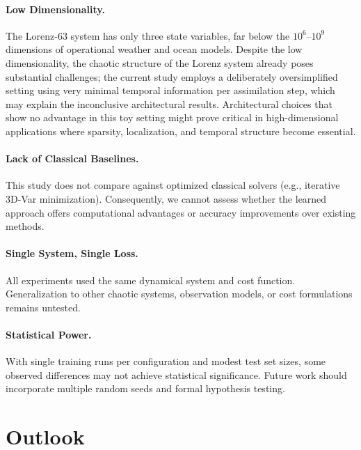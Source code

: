 \documentclass[12pt,a4paper]{article}
\begin{document}
\paragraph{Low Dimensionality.} The Lorenz-63 system has only three state variables, far below the $10^6$--$10^9$ dimensions of operational weather and ocean models. Despite the low dimensionality, the chaotic structure of the Lorenz system already poses substantial challenges; the current study employs a deliberately oversimplified setting using very minimal temporal information per assimilation step, which may explain the inconclusive architectural results. Architectural choices that show no advantage in this toy setting might prove critical in high-dimensional applications where sparsity, localization, and temporal structure become essential.

\paragraph{Lack of Classical Baselines.} This study does not compare against optimized classical solvers (e.g., iterative 3D-Var minimization). Consequently, we cannot assess whether the learned approach offers computational advantages or accuracy improvements over existing methods.

\paragraph{Single System, Single Loss.} All experiments used the same dynamical system and cost function. Generalization to other chaotic systems, observation models, or cost formulations remains untested.

\paragraph{Statistical Power.} With single training runs per configuration and modest test set sizes, some observed differences may not achieve statistical significance. Future work should incorporate multiple random seeds and formal hypothesis testing.

\clearpage

\section{Outlook}
\label{sec:outlook}
\end{document}
